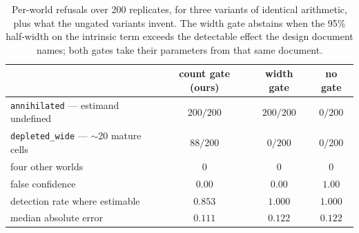 \begin{table}[htbp]
\small
\centering
\caption{Per-world refusals over 200 replicates, for three variants of identical
arithmetic, plus what the ungated variants invent. The width gate abstains when
the 95\% half-width on the intrinsic term exceeds the detectable effect the
design document names; both gates take their parameters from that same document.}
\label{tab:bench}
\begin{tabular}{@{}lccc@{}}
\toprule
& \textbf{count gate (ours)} & \textbf{width gate} & \textbf{no gate} \\
\midrule
\texttt{annihilated} --- estimand undefined & $200/200$ & $200/200$ & $0/200$ \\
\texttt{depleted\_wide} --- $\sim$20 mature cells & $88/200$ & $0/200$ & $0/200$ \\
four other worlds & 0 & 0 & 0 \\
\midrule
false confidence & $0.00$ & $0.00$ & $1.00$ \\
detection rate where estimable & $0.853$ & $1.000$ & $1.000$ \\
median absolute error & $0.111$ & $0.122$ & $0.122$ \\
\bottomrule
\end{tabular}
\end{table}
